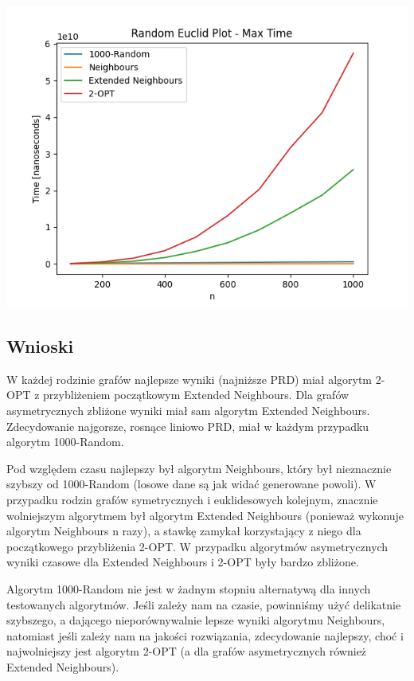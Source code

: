 \documentclass{article}
\begin{document}
\begin{center}
\includegraphics[width=\textwidth, 
                   height = 0.4\textheight, 
                   keepaspectratio]
                  {generated_euclid_max_time} 
\end{center}

\subsection{Wnioski}

W każdej rodzinie grafów najlepsze wyniki (najniższe PRD) miał algorytm 2-OPT z przybliżeniem początkowym Extended Neighbours. Dla grafów asymetrycznych zbliżone wyniki miał sam algorytm Extended Neighbours. Zdecydowanie najgorsze, rosnące liniowo PRD, miał w każdym przypadku algorytm 1000-Random.

Pod względem czasu najlepszy był algorytm Neighbours, który był nieznacznie szybszy od 1000-Random (losowe dane są jak widać generowane powoli). W przypadku rodzin grafów symetrycznych i euklidesowych kolejnym, znacznie wolniejszym algorytmem był algorytm Extended Neighbours (ponieważ wykonuje algorytm Neighbours n razy), a stawkę zamykał korzystający z niego dla początkowego przybliżenia 2-OPT. W przypadku algorytmów asymetrycznych wyniki czasowe dla Extended Neighbours i 2-OPT były bardzo zbliżone.

Algorytm 1000-Random nie jest w żadnym stopniu alternatywą dla innych testowanych algorytmów. Jeśli zależy nam na czasie, powinniśmy użyć delikatnie szybszego, a dającego nieporównywalnie lepsze wyniki algorytmu Neighbours, natomiast jeśli zależy nam na jakości rozwiązania, zdecydowanie najlepszy, choć i najwolniejszy jest algorytm 2-OPT (a dla grafów asymetrycznych również Extended Neighbours).
\end{document}

